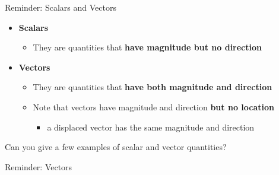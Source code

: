 {
\reminderslide

%
%
%

\begin{frame}{Reminder: Scalars and Vectors}

\begin{itemize}

\item {\bf Scalars}
  \begin{itemize}
     \item They are quantities that {\bf have magnitude but no direction}
  \end{itemize}

\vspace{0.3cm}

\item {\bf Vectors}
  \begin{itemize}
     \item They are quantities that {\bf have both magnitude and direction}
     \vspace{0.2cm}
     \item Note that vectors have magnitude and direction {\bf but no location}
     \begin{itemize}
         \item a displaced vector has the same magnitude and direction
     \end{itemize}
  \end{itemize}

\end{itemize}

\vspace{0.3cm}

\begin{center}
  Can you give a few examples of scalar and vector quantities?
\end{center}

\end{frame}


%
%
%

\begin{frame}{Reminder: Vectors}


\end{frame}}

